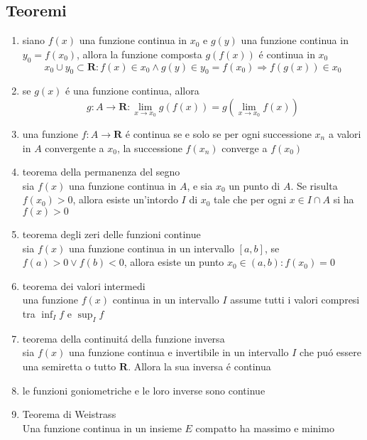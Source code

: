 \documentclass{exam}
\begin{document}
  \subsection{Teoremi}
    \begin{enumerate}
      \item
        siano $f(x)$ una funzione continua in $x_{0}$ e
        $g(y)$ una funzione continua in $y_{0}=f(x_{0})$, allora
        la funzione composta $g(f(x))$ \'e continua in $x_{0}$
        \begin{equation}
          x_{0}\cup y_{0}\subset \mathbf{R}:f(x) \in x_{0} \land g(y) 
          \in y_{0}=f(x_{0}) \Rightarrow f(g(x))\in x_{0}
        \end{equation}
      \item
        se $g(x)$ \'e una funzione continua, allora
        \begin{equation}
          g:A\rightarrow \mathbf{R}:\lim_{x\to x_{0}}g(f(x))=g(\lim_{x\to x_{0}}f(x))
        \end{equation}
      \item
        una funzione $f:A\rightarrow \mathbf{R}$ \'e continua se e solo se per ogni successione $x_{n}$ a valori in $A$ convergente a $x_{0}$, la successione $f(x_{n})$ converge a $f(x_{0})$
      \item{teorema della permanenza del segno}\\
        sia $f(x)$ una funzione continua in $A$, e sia $x_{0}$ un punto di $A$. Se risulta $f(x_{0})>0$, allora esiste un'intordo $I$ di $x_{0}$ tale che per ogni $x\in I\cap A$ si ha $f(x)>0$
      \item{teorema degli zeri delle funzioni continue}\\
        sia $f(x)$ una funzione continua in un intervallo $[a,b]$, se $f(a)>0 \lor f(b)<0$, allora esiste un punto $x_{0}\in (a,b):f(x_{0})=0$
      \item{teorema dei valori intermedi}\\
        una funzione $f(x)$ continua in un intervallo $I$ assume tutti i valori compresi tra $\inf_{I}f$ e $\sup_{I}f$
      \item{teorema della continuit\'a della funzione inversa}\\
        sia $f(x)$ una funzione continua e invertibile in un intervallo $I$ che pu\'o essere una semiretta o tutto $\mathbf{R}$. Allora la sua inversa \'e continua
      \item le funzioni goniometriche e le loro inverse sono continue
      \item{Teorema di Weistrass}\\
        Una funzione continua in un insieme $E$ compatto ha massimo e minimo
    \end{enumerate}
  \newpage
\end{document}
